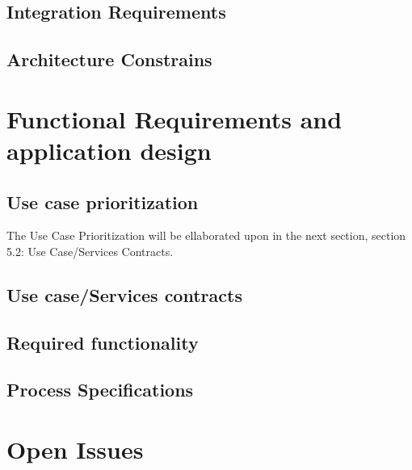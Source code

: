 \documentclass[10pt,a4paper]{exam}
\begin{document}
\subsection{Integration Requirements}
\lipsum[4]
\subsection{Architecture Constrains}
\lipsum[5]

\section{Functional Requirements and application design}
\subsection{Use case prioritization}
The Use Case Prioritization will be ellaborated upon in the next section, section 5.2: Use Case/Services Contracts.
\subsection{Use case/Services contracts}
\subsection{Required functionality}
\lipsum[8]
\subsection{Process Specifications}
\lipsum[9]

\section{Open Issues}
\lipsum[10]
%
%
\end{document}
